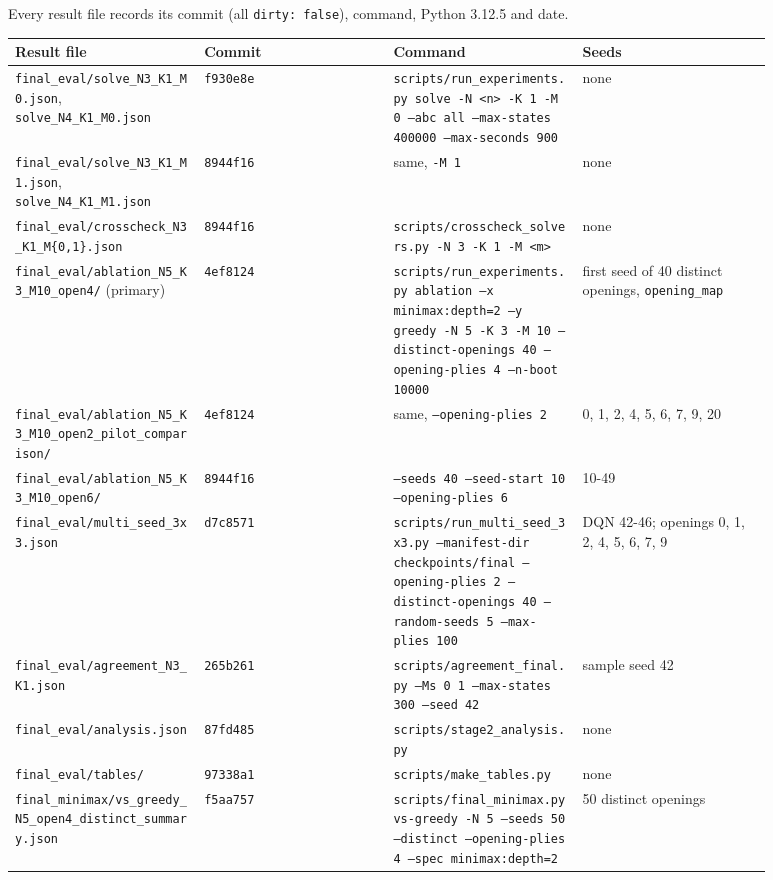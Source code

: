 \documentclass[11pt]{article}
\begin{document}
Every result file records its commit (all \texttt{dirty: false}), command, Python 3.12.5 and date.

\begin{center}\scriptsize
\begin{longtable}{p{0.22\linewidth}p{0.22\linewidth}p{0.22\linewidth}p{0.22\linewidth}}
\toprule
Result file & Commit & Command & Seeds \\
\midrule
\texttt{final\_eval/solve\_N3\_K1\_M0.json}, \texttt{solve\_N4\_K1\_M0.json} & \texttt{f930e8e} & \texttt{scripts/run\_experiments.py solve -N <n> -K 1 -M 0 --abc all --max-states 400000 --max-seconds 900} & none \\
\texttt{final\_eval/solve\_N3\_K1\_M1.json}, \texttt{solve\_N4\_K1\_M1.json} & \texttt{8944f16} & same, \texttt{-M 1} & none \\
\texttt{final\_eval/crosscheck\_N3\_K1\_M\{0,1\}.json} & \texttt{8944f16} & \texttt{scripts/crosscheck\_solvers.py -N 3 -K 1 -M <m>} & none \\
\texttt{final\_eval/ablation\_N5\_K3\_M10\_open4/} (primary) & \texttt{4ef8124} & \texttt{scripts/run\_experiments.py ablation --x minimax:depth=2 --y greedy -N 5 -K 3 -M 10 --distinct-openings 40 --opening-plies 4 --n-boot 10000} & first seed of 40 distinct openings, \texttt{opening\_map} \\
\texttt{final\_eval/ablation\_N5\_K3\_M10\_open2\_pilot\_comparison/} & \texttt{4ef8124} & same, \texttt{--opening-plies 2} & 0, 1, 2, 4, 5, 6, 7, 9, 20 \\
\texttt{final\_eval/ablation\_N5\_K3\_M10\_open6/} & \texttt{8944f16} & \texttt{--seeds 40 --seed-start 10 --opening-plies 6} & 10-49 \\
\texttt{final\_eval/multi\_seed\_3x3.json} & \texttt{d7c8571} & \texttt{scripts/run\_multi\_seed\_3x3.py --manifest-dir checkpoints/final --opening-plies 2 --distinct-openings 40 --random-seeds 5 --max-plies 100} & DQN 42-46; openings 0, 1, 2, 4, 5, 6, 7, 9 \\
\texttt{final\_eval/agreement\_N3\_K1.json} & \texttt{265b261} & \texttt{scripts/agreement\_final.py --Ms 0 1 --max-states 300 --seed 42} & sample seed 42 \\
\texttt{final\_eval/analysis.json} & \texttt{87fd485} & \texttt{scripts/stage2\_analysis.py} & none \\
\texttt{final\_eval/tables/} & \texttt{97338a1} & \texttt{scripts/make\_tables.py} & none \\
\texttt{final\_minimax/vs\_greedy\_N5\_open4\_distinct\_summary.json} & \texttt{f5aa757} & \texttt{scripts/final\_minimax.py vs-greedy -N 5 --seeds 50 --distinct --opening-plies 4 --spec minimax:depth=2} & 50 distinct openings \\

\end{longtable}
\end{center}
\end{document}

